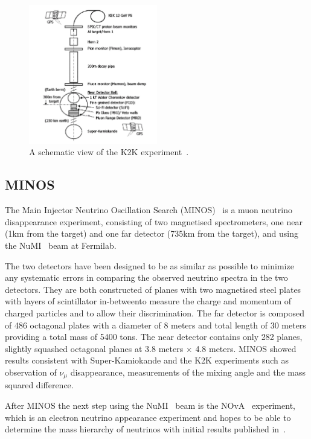 \begin{figure}[h!]
\centering
  \centering
\includegraphics[width=0.5\textwidth]{figures/KEK.jpeg}
\vspace{2mm}
\caption{A schematic view of the K2K experiment~\cite{70K2K}.}
\label{fig:K2K}
\end{figure}

\subsection{MINOS}

The Main Injector Neutrino Oscillation Search (MINOS)~\cite{MINOS} is a muon neutrino disappearance experiment, consisting of two magnetised spectrometers, one near (1km from the target) and one far detector (735km from the target), and using the NuMI~\cite{19NuMI} beam at Fermilab. 

The two detectors have been designed to be as similar as possible to minimize any systematic errors in comparing the observed neutrino spectra in the two detectors. They are both constructed of planes with two magnetised steel plates with layers of scintillator in-betweento measure the charge and momentum of charged particles and to allow their discrimination. The far detector is composed of 486 octagonal plates with a diameter of 8 meters and total length of 30 meters providing a total mass of 5400 tons. The near detector contains only 282 planes, slightly squashed octagonal planes at 3.8 meters $\times$ 4.8 meters. MINOS showed results consistent with Super-Kamiokande and the K2K experiments such as observation of $\nu_\mu$ disappearance, measurements of the mixing angle and the mass squared difference.

After MINOS the next step using the NuMI~\cite{19NuMI} beam is the NOvA~\cite{18nova} experiment, which is an electron neutrino appearance experiment and hopes to be able to determine the mass hierarchy of neutrinos with initial results published in~\cite{103NOVA}.

